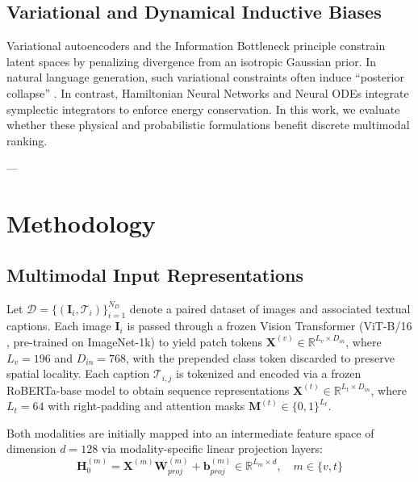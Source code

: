 \documentclass[journal]{IEEEtran}
\begin{document}
\subsection{Variational and Dynamical Inductive Biases}
Variational autoencoders \cite{kingma2013auto} and the Information Bottleneck principle \cite{tishby2000information, alemi2016deep} constrain latent spaces by penalizing divergence from an isotropic Gaussian prior. In natural language generation, such variational constraints often induce ``posterior collapse'' \cite{bowman2015generating}. In contrast, Hamiltonian Neural Networks \cite{greydanus2019hamiltonian} and Neural ODEs \cite{chen2018neural} integrate symplectic integrators to enforce energy conservation. In this work, we evaluate whether these physical and probabilistic formulations benefit discrete multimodal ranking.

---

\section{Methodology}

\subsection{Multimodal Input Representations}
Let $\mathcal{D} = \{(\mathbf{I}_i, \mathcal{T}_i)\}_{i=1}^{N_D}$ denote a paired dataset of images and associated textual captions. Each image $\mathbf{I}_i$ is passed through a frozen Vision Transformer (ViT-B/16 \cite{dosovitskiy2020image}, pre-trained on ImageNet-1k) to yield patch tokens $\mathbf{X}^{(v)} \in \mathbb{R}^{L_v \times D_{in}}$, where $L_v = 196$ and $D_{in} = 768$, with the prepended class token discarded to preserve spatial locality. Each caption $\mathcal{T}_{i,j}$ is tokenized and encoded via a frozen RoBERTa-base model \cite{liu2019roberta} to obtain sequence representations $\mathbf{X}^{(t)} \in \mathbb{R}^{L_t \times D_{in}}$, where $L_t = 64$ with right-padding and attention masks $\mathbf{M}^{(t)} \in \{0, 1\}^{L_t}$.

Both modalities are initially mapped into an intermediate feature space of dimension $d = 128$ via modality-specific linear projection layers:
\begin{equation}
\mathbf{H}_0^{(m)} = \mathbf{X}^{(m)} \mathbf{W}_{proj}^{(m)} + \mathbf{b}_{proj}^{(m)} \in \mathbb{R}^{L_m \times d}, \quad m \in \{v, t\}
\end{equation}
\end{document}
